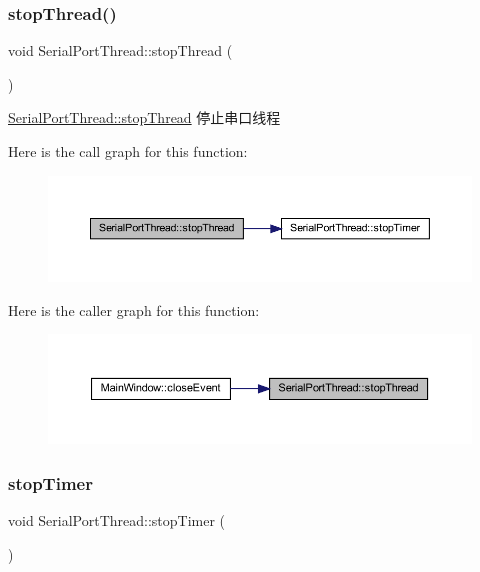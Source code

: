 \subsubsection{\texorpdfstring{stopThread()}{stopThread()}}
{\footnotesize\ttfamily void Serial\+Port\+Thread\+::stop\+Thread (\begin{DoxyParamCaption}{ }\end{DoxyParamCaption})}



\mbox{\hyperlink{class_serial_port_thread_ae7403dd74cb71b0e925e933073020cd2}{Serial\+Port\+Thread\+::stop\+Thread}} 停止串口线程 

Here is the call graph for this function\+:
\nopagebreak
\begin{figure}[H]
\begin{center}
\leavevmode
\includegraphics[width=350pt]{class_serial_port_thread_ae7403dd74cb71b0e925e933073020cd2_cgraph}
\end{center}
\end{figure}
Here is the caller graph for this function\+:
\nopagebreak
\begin{figure}[H]
\begin{center}
\leavevmode
\includegraphics[width=350pt]{class_serial_port_thread_ae7403dd74cb71b0e925e933073020cd2_icgraph}
\end{center}
\end{figure}
\mbox{\label{class_serial_port_thread_adfceb467826dc0f59d0eb66c1ba0a1a6}} 
\subsubsection{\texorpdfstring{stopTimer}{stopTimer}}
{\footnotesize\ttfamily void Serial\+Port\+Thread\+::stop\+Timer (\begin{DoxyParamCaption}{ }\end{DoxyParamCaption})\hspace{0.3cm}{\ttfamily [slot]}}



